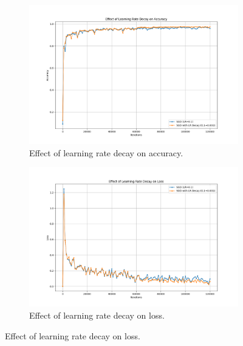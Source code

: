 \documentclass{article}
\begin{document}
\begin{figure}[H]
    \centering
    \begin{subfigure}[t]{0.48\textwidth}
        \vspace{0pt}%
        \centering
        \includegraphics[width=1.1\textwidth]{plots/part2b_lr_decay_accuracy.png}
        \caption{Effect of learning rate decay on accuracy.}
        \label{fig:lr_decay_accuracy}
    \end{subfigure}
    \hfill
    \begin{subfigure}[t]{0.48\textwidth}
        \vspace{0pt}%
        \centering
        \includegraphics[width=1.1\textwidth]{plots/part2b_lr_decay_loss.png}
        \caption{Effect of learning rate decay on loss.}
        \label{fig:lr_decay_loss}

    \end{subfigure}
\end{figure}
\end{document}
